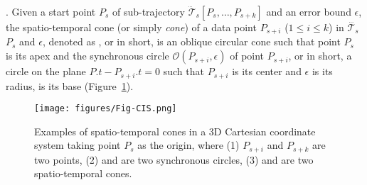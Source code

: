 . 
Given a start point $P_s$ of sub-trajectory $\dddot{\mathcal{T}}_s[P_s, \ldots, P_{s+k}]$ and an error bound $\epsilon$, the spatio-temporal cone (or simply \textit{cone}) of a data point $P_{s+i}$ ($1\le i\le k$) in $\dddot{\mathcal{T}_s}$ \wrt $P_s$ and $\epsilon$, denoted as , or  in short, is an oblique circular cone such that point $P_s$ is its apex and the synchronous circle $\mathcal{O}(P_{s+i}, \epsilon)$ of point $P_{s+i}$, or  in short, a circle on the plane $P.t-P_{s+i}.t = 0$ such that $P_{s+i}$ is its center and $\epsilon$ is its radius, is its base (Figure~\ref{fig:cis}).







\begin{figure}[tb!]
	\centering
	\texttt{[image: figures/Fig-CIS.png]}
	\vspace{-2ex}
	\caption{\small Examples of spatio-temporal cones in a 3D Cartesian coordinate system taking point $P_s$ as the origin, where (1) $P_{s+i}$ and $P_{s+k}$ are two points, (2)  and  are two synchronous circles, (3)  and  are two spatio-temporal cones.}
	\vspace{-1ex}
	\label{fig:cis}
\end{figure}

